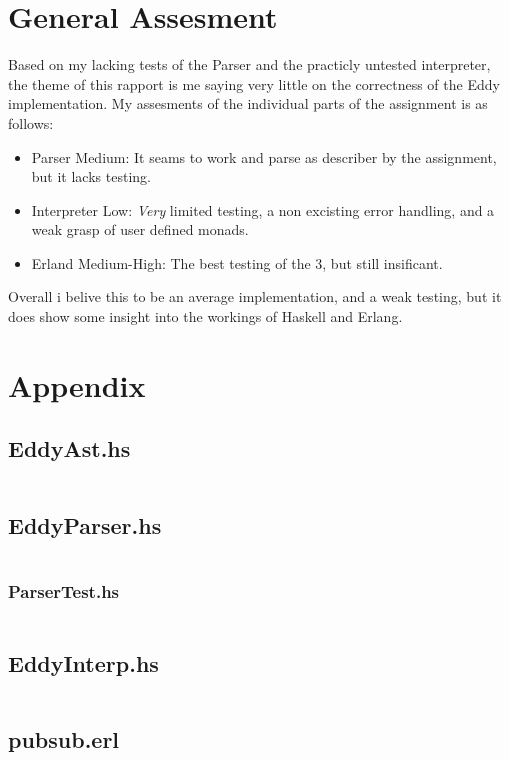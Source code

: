 \documentclass{article}
\begin{document}
\section{General Assesment}

Based on my lacking tests of the Parser and the practicly untested
interpreter, the theme of this rapport is me saying very little on 
the correctness of the Eddy implementation. My assesments
of the individual parts of the assignment is as follows:
\begin{itemize}
    \item{Parser} Medium: It seams to work and parse as describer by the assignment, but it lacks testing.
    \item{Interpreter} Low: \emph{Very} limited testing, a non excisting error handling, and a weak grasp of user defined monads.
    \item{Erland} Medium-High: The best testing of the 3, but still insificant. 
\end{itemize}
Overall i belive this to be an average implementation, and a weak testing, but it does show some insight into the workings of Haskell and Erlang.

\newpage
\section{Appendix}
\subsection*{EddyAst.hs}
\inputminted{haskell}{eddy/EddyAst.hs}

\newpage
\subsection*{EddyParser.hs}
\inputminted{haskell}{eddy/EddyParser.hs}

\newpage
\subsubsection*{ParserTest.hs}
\inputminted{haskell}{eddy/ParserTest.hs}

\newpage
\subsection*{EddyInterp.hs}
\inputminted{haskell}{eddy/EddyInterp.hs}

\newpage
\subsection*{pubsub.erl}
\inputminted{erlang}{pubsub/pubsub.erl}
\end{document}
